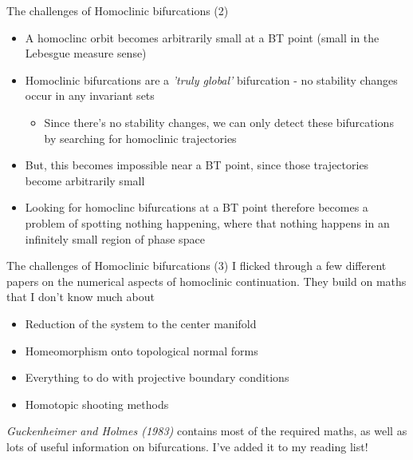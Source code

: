 \documentclass[presentation]{beamer}
\begin{document}
\begin{frame}[label={sec:org98e287d}]{The challenges of Homoclinic bifurcations (2)}
\begin{itemize}[<+->]
\item A homoclinc orbit becomes arbitrarily small at a BT point (small in the Lebesgue measure sense)
\item Homoclinic bifurcations are a \emph{'truly global'} bifurcation - no stability changes occur in any invariant sets
\begin{itemize}
\item Since there's no stability changes, we can only detect these bifurcations by searching for homoclinic trajectories
\end{itemize}
\item But, this becomes impossible near a BT point, since those trajectories become arbitrarily small
\item Looking for homoclinc bifurcations at a BT point therefore becomes a problem of spotting nothing happening, where that nothing happens in an infinitely small region of phase space
\end{itemize}
\end{frame}

\begin{frame}[label={sec:orgaa8dcf4}]{The challenges of Homoclinic bifurcations (3)}
I flicked through a few different papers on the numerical aspects of homoclinic continuation. 
They build on maths that I don't know much about
\begin{itemize}
\item Reduction of the system to the center manifold
\item Homeomorphism onto topological normal forms
\item Everything to do with projective boundary conditions
\item Homotopic shooting methods
\end{itemize}

\emph{Guckenheimer and Holmes (1983)} contains most of the required maths, as well as lots of useful information on bifurcations.
I've added it to my reading list!
\end{frame}
\end{document}
